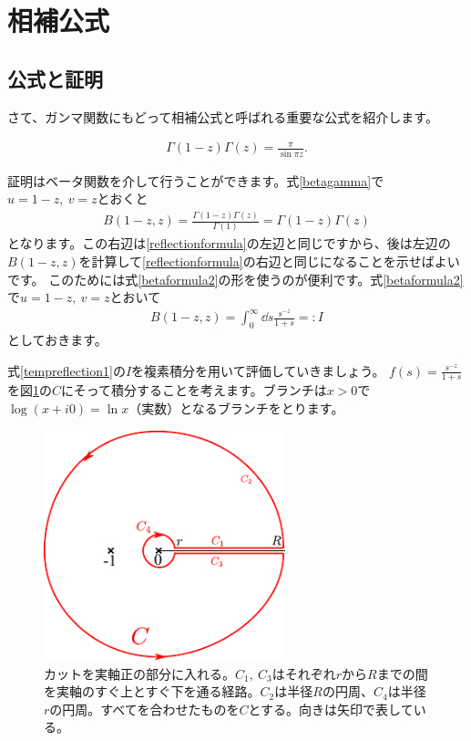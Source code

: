 \documentclass[report,paper=a4, fontsize=12pt, line_length=16cm, number_of_lines=33,dvipdfmx]{jlreq}
\newenvironment{important}{\begin{tcolorbox}[
  colback = white,
  colframe = red!35,
  boxrule = 2mm,
  fonttitle = \bfseries,
  after = \noindent] }{\end{tcolorbox}}
\numberwithin{equation}{section}
\begin{document}
\section{相補公式}
\subsection{公式と証明}
さて、ガンマ関数にもどって相補公式と呼ばれる重要な公式を紹介します。
\begin{important}
  \begin{align}
    \Gamma(1-z)\Gamma(z)=\frac{\pi}{\sin\pi z}.\label{reflectionformula}
  \end{align}
\end{important}

証明はベータ関数を介して行うことができます。式\eqref{betagamma}で$u=1-z,\ v=z$とおくと
\begin{align}
  B(1-z,z)=\frac{\Gamma(1-z)\Gamma(z)}{\Gamma(1)}=\Gamma(1-z)\Gamma(z)
  \label{tempreflection0}
\end{align}
となります。この右辺は\eqref{reflectionformula}の左辺と同じですから、後は左辺の$B(1-z,z)$を計算して\eqref{reflectionformula}の右辺と同じになることを示せばよいです。
このためには式\eqref{betaformula2}の形を使うのが便利です。式\eqref{betaformula2}で$u=1-z,\ v=z$とおいて
\begin{align}
  B(1-z,z)=\int_{0}^{\infty}\dd{s} \frac{s^{-z}}{1+s}=:I\label{tempreflection1}
\end{align}
としておきます。

式\eqref{tempreflection1}の$I$を複素積分を用いて評価していきましょう。
$f(s)=\frac{s^{-z}}{1+s}$を図\ref{fig:betaz1-z}の$C$にそって積分することを考えます。ブランチは$x>0$で$\log(x+i0)=\ln x$（実数）となるブランチをとります。
\begin{figure}[htbp]
  \centering
  \includegraphics[width=7cm]{betaz1-z.pdf}
  \caption{カットを実軸正の部分に入れる。$C_1,\ C_3$はそれぞれ$r$から$R$までの間を実軸のすぐ上とすぐ下を通る経路。$C_2$は半径$R$の円周、$C_4$は半径$r$の円周。すべてを合わせたものを$C$とする。向きは矢印で表している。}
  \label{fig:betaz1-z}
\end{figure}
\end{document}
